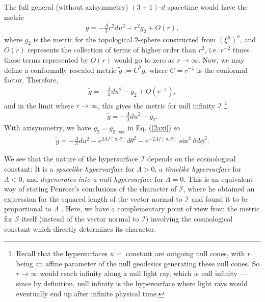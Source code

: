 \documentclass[aps,pre,preprint,superscriptaddress,showpacs,showkeys]{revtex4-1}
\begin{document}
The full general (without axisymmetry) $(3+1)$-$d$ spacetime would have the metric
\begin{eqnarray}
g=-\frac{\Lambda}{3}r^2du^2-r^2g_2+O(r),
\end{eqnarray}
where $g_2$ is the metric for the topological 2-sphere constructed from $(\xi^\mu)^o$, and $O(r)$ represents the collection of terms of higher order than $r^2$, i.e. $r^{-2}$ times those terms represented by $O(r)$ would go to zero as $r\rightarrow\infty$. Now, we may define a conformally rescaled metric $\tilde{g}:=C^2g$, where $C=r^{-1}$ is the conformal factor. Therefore,
\begin{eqnarray}
\tilde{g}=-\frac{\Lambda}{3}du^2-g_2+O(r^{-1}),
\end{eqnarray}
and in the limit where $r\rightarrow\infty$, this gives the metric for null infinity $\mathcal{I}$ \footnote{Recall that the hypersurfaces $u=$ constant are outgoing null cones, with $r$ being an affine parameter of the null geodesics generating these null cones. So $r\rightarrow\infty$ would reach infinity along a null light ray, which is null infinity --- since by definition, null infinity is the hypersurface where light rays would eventually end up after infinite physical time.}
\begin{eqnarray}\label{metforscri}
\tilde{g}=-\frac{\Lambda}{3}du^2-g_2.
\end{eqnarray}
With axisymmetry, we have $g_2=g_{2,axi}$ in Eq. (\ref{2axi}) so
\begin{eqnarray}\label{scriaxi}
\tilde{g}=-\frac{\Lambda}{3}du^2-e^{2\Lambda f(u,\theta)}d\theta^2-e^{-2\Lambda f(u,\theta)}\sin^2{\theta}d\phi^2.
\end{eqnarray}

We see that the nature of the hypersurface $\mathcal{I}$ depends on the cosmological constant: It is a \emph{spacelike hypersurface} for $\Lambda>0$, a \emph{timelike hypersurface} for $\Lambda<0$, and \emph{degenerates into a null hypersurface} for $\Lambda=0$. This is an equivalent way of stating Penrose's conclusions of the character of $\mathcal{I}$, where he obtained an expression for the squared length of the vector normal to $\mathcal{I}$ and found it to be proportional to $\Lambda$ \cite{Pen65}. Here, we have a complementary point of view from the metric for $\mathcal{I}$ itself (instead of the vector normal to $\mathcal{I}$) involving the cosmological constant which directly determines its character.
\end{document}

